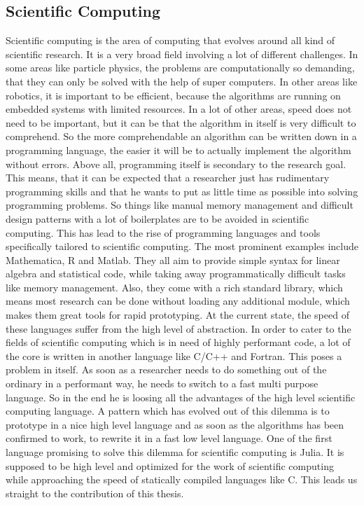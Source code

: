\subsection{Scientific Computing}
Scientific computing is the area of computing that evolves around all kind of scientific research.
It is a very broad field involving a lot of different challenges. 
In some areas like particle physics, the problems are computationally so demanding, that they can only be solved with the help of super computers.
In other areas like robotics, it is important to be efficient, because the algorithms are running on embedded systems with limited resources. 
In a lot of other areas, speed does not need to be important, but it can be that the algorithm in itself is very difficult to comprehend. 
So the more comprehendable an algorithm can be written down in a programming language, the easier it will be to actually implement the algorithm without errors.
Above all, programming itself is secondary to the research goal.
This means, that it can be expected that a researcher just has rudimentary programming skills and that he wants to put as little time as possible into solving programming problems.
So things like manual memory management and difficult design patterns with a lot of boilerplates are to be avoided in scientific computing.
This has lead to the rise of programming languages and tools specifically tailored to scientific computing.
The most prominent examples include Mathematica, R and Matlab.
They all aim to provide simple syntax for linear algebra and statistical code, while taking away programmatically difficult tasks like memory management. Also, they come with a rich standard library, which means most research can be done without loading any additional module, which makes them great tools for rapid prototyping.
At the current state, the speed of these languages suffer from the high level of abstraction. In order to cater to the fields of scientific computing which is in need of highly performant code, a lot of the core is written in another language like C/C++ and Fortran. This poses a problem in itself. 
As soon as a researcher needs to do something out of the ordinary in a performant way, he needs to switch to a fast multi purpose language. So in the end he is loosing all the advantages of the high level scientific computing language.
A pattern which has evolved out of this dilemma is to prototype in a nice high level language and as soon as the algorithms has been confirmed to work, to rewrite it in a fast low level language.
One of the first language promising to solve this dilemma for scientific computing is Julia. 
It is supposed to be high level and optimized for the work of scientific computing while approaching the speed of statically compiled languages like C.
This leads us straight to the contribution of this thesis.


